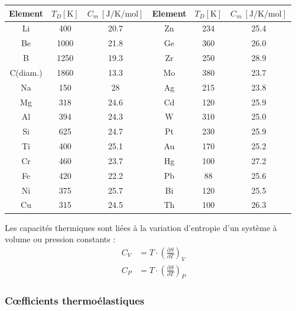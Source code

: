 \documentclass[a4paper]{book}
\begin{document}
\begin{center}
\begin{tabular}{cccccc}
\toprule
Element & $T_D [\si{\kelvin}]$ & $C_m ~ [\si{\joule\per\kelvin\per\mole}]$ & Element & $T_D [\si{\kelvin}]$ & $C_m ~ [\si{\joule\per\kelvin\per\mole}]$ \\
\midrule
Li       & 400  & 20.7 &  Zn & 234 & 25.4 \\
Be       & 1000 & 21.8 &  Ge & 360 & 26.0 \\
B        & 1250 & 19.3 &  Zr & 250 & 28.9 \\
C(diam.) & 1860 & 13.3 &  Mo & 380 & 23.7 \\
Na       & 150  & 28   &  Ag & 215 & 23.8 \\
Mg       & 318  & 24.6 &  Cd & 120 & 25.9 \\
Al       & 394  & 24.3 &  W  & 310 & 25.0 \\
Si       & 625  & 24.7 &  Pt & 230 & 25.9 \\
Ti       & 400  & 25.1 &  Au & 170 & 25.2 \\
Cr       & 460  & 23.7 &  Hg & 100 & 27.2 \\
Fe       & 420  & 22.2 &  Pb & 88  & 25.6 \\
Ni       & 375  & 25.7 &  Bi & 120 & 25.5 \\
Cu       & 315  & 24.5 &  Th & 100 & 26.3 \\
\bottomrule
\end{tabular}
\end{center}

Les capacités thermiques sont liées à la variation d'entropie d'un système à volume ou pression constants : 
\begin{align*}
C_V &= T \cdot \left( \frac{\partial S}{\partial T} \right)_V \\
C_P &= T \cdot \left( \frac{\partial S}{\partial T} \right)_P
\end{align*}


\subsubsection{C{\oe}fficients thermoélastiques}
\end{document}
